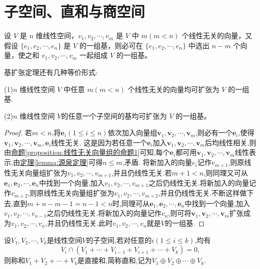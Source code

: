 \documentclass[../../main.tex]{subfiles}%
\begin{document}
\section{子空间、直和与商空间}

\begin{theorem}[基扩张定理]\label{theorem:基扩张定理}
设 $V$ 是 $n$ 维线性空间，$v_1, v_2, \cdots, v_m$ 是 $V$ 中 $m (m < n)$ 个线性无关的向量，又假设 $\{e_1, e_2, \cdots, e_n\}$ 是 $V$ 的一组基，则必可在 $\{e_1, e_2, \cdots, e_n\}$ 中选出 $n - m$ 个向量，使之和 $v_1, v_2, \cdots, v_m$ 一起组成 $V$ 的一组基。

基扩张定理还有几种等价形式:

(1)$n$ 维线性空间 $V$ 中任意 $m (m < n)$ 个线性无关的向量均可扩张为 $V$ 的一组基.

(2)$n$ 维线性空间 $V$的任意一个子空间的基均可扩张为 $V$ 的一组基。
\end{theorem}
\begin{proof}
若\(m< n\),将\(\boldsymbol{e}_i(1\leqslant  i\leqslant  n)\)依次加入向量组\(\boldsymbol{v}_1,\boldsymbol{v}_2,\cdots,\boldsymbol{v}_m\),则必有一个\(\boldsymbol{e}_i\),使得\(\boldsymbol{v}_1,\boldsymbol{v}_2,\cdots,\boldsymbol{v}_m,\boldsymbol{e}_i\)线性无关. 这是因为若任意一个\(\boldsymbol{e}_i\)加入\(\boldsymbol{v}_1,\boldsymbol{v}_2,\cdots,\boldsymbol{v}_m\)后均线性相关,则由\hyperref[proposition:线性无关向量组的命题1]{命题\ref{proposition:线性无关向量组的命题1}}可知,每个\(\boldsymbol{e}_i\)都可用\(\boldsymbol{v}_1,\boldsymbol{v}_2,\cdots,\boldsymbol{v}_m\)线性表示,由\hyperref[lemma:源泉定理]{定理\ref{lemma:源泉定理}}可得\(n\leqslant  m\),矛盾. 将新加入的向量$e_i$记作$v_{m+1}$,则原线性无关向量组扩张为$v_1,v_2,\cdots,v_{m+1}$,并且仍线性无关.若\(m + 1< n\),则同理又可从\(\boldsymbol{e}_1,\boldsymbol{e}_2,\cdots,\boldsymbol{e}_n\)中找到一个向量,加入$v_1,v_2,\cdots,v_{m+1}$之后仍线性无关.将新加入的向量记作$v_{m+2}$,则原线性无关向量组扩张为$v_1,v_2,\cdots,v_{m+2}$,并且仍线性无关.不断这样做下去,直到$m+n-m-1=n-1<n$时,同理可从\(\boldsymbol{e}_1,\boldsymbol{e}_2,\cdots,\boldsymbol{e}_n\)中找到一个向量,加入$v_1,v_2,\cdots,v_{n-1}$之后仍线性无关.将新加入的向量记作$v_{n}$,则可将\(\boldsymbol{v}_1,\boldsymbol{v}_2,\cdots,\boldsymbol{v}_m\)扩张成为$v_1,v_2,\cdots,v_{n}$,并且仍线性无关.此时$v_1,v_2,\cdots,v_{n}$就是\(V\)的一组基.
\end{proof}

\begin{definition}[直和]\label{definition:直和}
设\(V_1,V_2,\cdots,V_k\)是线性空间\(V\)的子空间,若对任意的\(i(1\leqslant  i\leqslant  k)\),均有
\[
V_i\cap(V_1+\cdots+V_{i - 1}+V_{i + 1}+\cdots+V_k)=0,
\]
则称和\(V_1 + V_2+\cdots+V_k\)是直接和,简称直和,记为\(V_1\oplus V_2\oplus\cdots\oplus V_k\).
\end{definition}
\end{document}
